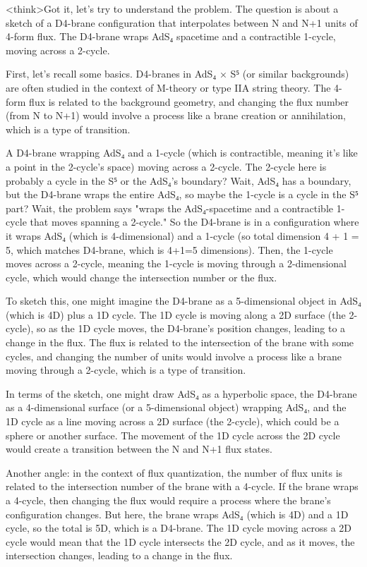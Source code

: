 <think>Got it, let's try to understand the problem. The question is about a sketch of a D4-brane configuration that interpolates between N and N+1 units of 4-form flux. The D4-brane wraps AdS₄ spacetime and a contractible 1-cycle, moving across a 2-cycle. 

First, let's recall some basics. D4-branes in AdS₄ × S⁵ (or similar backgrounds) are often studied in the context of M-theory or type IIA string theory. The 4-form flux is related to the background geometry, and changing the flux number (from N to N+1) would involve a process like a brane creation or annihilation, which is a type of transition.

A D4-brane wrapping AdS₄ and a 1-cycle (which is contractible, meaning it's like a point in the 2-cycle's space) moving across a 2-cycle. The 2-cycle here is probably a cycle in the S⁵ or the AdS₄'s boundary? Wait, AdS₄ has a boundary, but the D4-brane wraps the entire AdS₄, so maybe the 1-cycle is a cycle in the S⁵ part? Wait, the problem says "wraps the AdS₄-spacetime and a contractible 1-cycle that moves spanning a 2-cycle." So the D4-brane is in a configuration where it wraps AdS₄ (which is 4-dimensional) and a 1-cycle (so total dimension 4 + 1 = 5, which matches D4-brane, which is 4+1=5 dimensions). Then, the 1-cycle moves across a 2-cycle, meaning the 1-cycle is moving through a 2-dimensional cycle, which would change the intersection number or the flux.

To sketch this, one might imagine the D4-brane as a 5-dimensional object in AdS₄ (which is 4D) plus a 1D cycle. The 1D cycle is moving along a 2D surface (the 2-cycle), so as the 1D cycle moves, the D4-brane's position changes, leading to a change in the flux. The flux is related to the intersection of the brane with some cycles, and changing the number of units would involve a process like a brane moving through a 2-cycle, which is a type of transition.

In terms of the sketch, one might draw AdS₄ as a hyperbolic space, the D4-brane as a 4-dimensional surface (or a 5-dimensional object) wrapping AdS₄, and the 1D cycle as a line moving across a 2D surface (the 2-cycle), which could be a sphere or another surface. The movement of the 1D cycle across the 2D cycle would create a transition between the N and N+1 flux states.

Another angle: in the context of flux quantization, the number of flux units is related to the intersection number of the brane with a 4-cycle. If the brane wraps a 4-cycle, then changing the flux would require a process where the brane's configuration changes. But here, the brane wraps AdS₄ (which is 4D) and a 1D cycle, so the total is 5D, which is a D4-brane. The 1D cycle moving across a 2D cycle would mean that the 1D cycle intersects the 2D cycle, and as it moves, the intersection changes, leading to a change in the flux.

